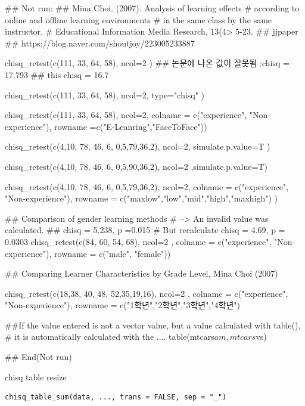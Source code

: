 \documentclass[a4paper]{book}
\begin{document}
\begin{Examples}
\begin{ExampleCode}

## Not run: 
## Mina Choi. (2007). Analysis of learning effects
# according to online and offline learning environments
#  in the same class by the same instructor.
#  Educational Information Media Research, 13(4>  5-23.
## jjpaper
## https://blog.naver.com/shoutjoy/223005233887

chisq_retest(c(111, 33, 64, 58), ncol=2 )
## 논문에 나온 값이 잘못됨 :chisq = 17.793
## this chisq = 16.7

chisq_retest(c(111, 33, 64, 58), ncol=2, type="chisq" )

chisq_retest(c(111, 33, 64, 58), ncol=2,
  colname = c("experience", "Non-experience"),
  rowname =c("E-Leanring","FaceToFace"))

chisq_retest(c(4,10, 78, 46, 6, 0,5,79,36,2),
  ncol=2, simulate.p.value=T )

chisq_retest(c(4,10, 78, 46, 6, 0,5,90,36,2),
  ncol=2 ,simulate.p.value=T)

chisq_retest(c(4,10, 78, 46, 6, 0,5,79,36,2), ncol=2,
  colname = c("experience", "Non-experience"),
  rowname = c("maxlow","low","mid","high","maxhigh") )


##  Comparison of gender learning methods
# --> An invalid value was calculated.
## chisq = 5.238, p =0.015
# But recalculate chisq = 4.69, p = 0.0303
chisq_retest(c(84, 60, 54, 68), ncol=2 ,
             colname = c("experience", "Non-experience"),
                          rowname = c("male", "female"))

## Comparing Learner Characteristics by Grade Level, Mina Choi (2007)

chisq_retest(c(18,38, 40, 48, 52,35,19,16), ncol=2 ,
colname = c("experience", "Non-experience"),
rowname = c("1학년","2학년","3학년","4학년")


##If the value entered is not a vector value, but a value calculated with table(),
# it is automatically calculated with the ....
table(mtcars$am, mtcars$vs) %


## End(Not run)


\end{ExampleCode}
\end{Examples}
%
\begin{Description}
chisq table resize
\end{Description}
%
\begin{Usage}
\begin{verbatim}
chisq_table_sum(data, ..., trans = FALSE, sep = "_")
\end{verbatim}
\end{Usage}
\end{document}

